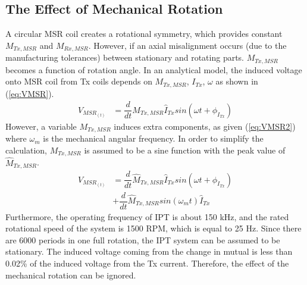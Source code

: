 \documentclass[journal]{IEEEtran}
\begin{document}
\subsection{The Effect of Mechanical Rotation}
A circular MSR coil creates a rotational symmetry, which provides constant $M_{Tx,MSR}$ and $M_{Rx,MSR}$. However, if an axial misalignment occurs (due to the manufacturing tolerances) between stationary and rotating parts.
$M_{Tx,MSR}$ becomes a function of rotation angle. In an analytical model, the induced voltage onto MSR coil from Tx coils depends on $M_{Tx,MSR}$, $I_{Tx}$, $\omega$ as shown in (\ref{eq:VMSR}). 
\begin{equation}
    \label{eq:VMSR}
    \begin{split}
         V_{MSR}_{(t)} &= \dfrac{d}{dt} M_{Tx,MSR} \hat{I}_{Tx}sin(\omega t+ \phi_{I_{Tx}}) 
    \end{split}
\end{equation}
However, a variable $M_{Tx,MSR}$ induces extra components, as given  (\ref{eq:VMSR2}) where $\omega_m$ is the mechanical angular frequency. In order to simplify the calculation, $M_{Tx,MSR}$ is assumed to be a sine function  with the peak value of $\hat{M}_{Tx,MSR}$.
\begin{equation}
    \label{eq:VMSR2}
    \begin{split}
         V_{MSR}_{(t)} &= \dfrac{d}{dt} \hat{M}_{Tx,MSR} \hat{I}_{Tx}sin(\omega t+ \phi_{I_{Tx}}) \\ &+ \dfrac{d}{dt} \hat{M}_{Tx,MSR}sin(\omega_m t)\hat{I}_{Tx} 
    \end{split}
\end{equation}
Furthermore, the operating frequency of IPT  is about 150 kHz, and the rated rotational speed of the system is 1500 RPM, which is equal to 25 Hz. Since there are 6000 periods in one full rotation, the IPT system can be assumed to be stationary.
The induced voltage coming from the change in mutual is less than 0.02\% of the induced voltage from the Tx current. Therefore, the effect of the mechanical rotation can be ignored.
\end{document}
